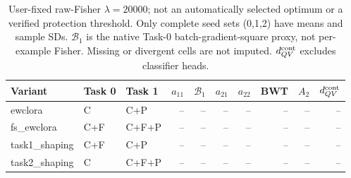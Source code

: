 \begin{table}[t]
\centering
\begin{tabular}{lllrrrrrrr}
\hline
Variant & Task 0 & Task 1 & $a_{11}$ & $\mathcal B_1$ & $a_{21}$ & $a_{22}$ & BWT & $A_2$ & $d_{QV}^{\rm cont}$ \\
\hline
ewclora & C & C+P & -- & -- & -- & -- & -- & -- & -- \\
fs\_ewclora & C+F & C+F+P & -- & -- & -- & -- & -- & -- & -- \\
task1\_shaping & C+F & C+P & -- & -- & -- & -- & -- & -- & -- \\
task2\_shaping & C & C+F+P & -- & -- & -- & -- & -- & -- & -- \\
\hline
\end{tabular}
\caption{User-fixed raw-Fisher $\lambda=20000$; not an automatically selected optimum or a verified protection threshold. Only complete seed sets (0,1,2) have means and sample SDs. $\mathcal B_1$ is the native Task-0 batch-gradient-square proxy, not per-example Fisher. Missing or divergent cells are not imputed. $d_{QV}^{\rm cont}$ excludes classifier heads.}
\end{table}
